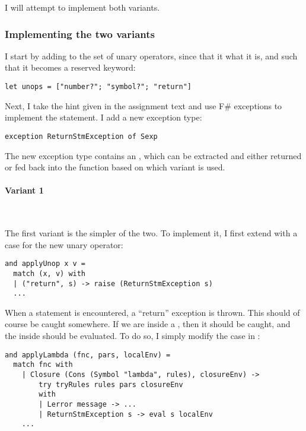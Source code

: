 I will attempt to implement both variants.

\subsubsection{Implementing the two variants}

I start by adding  to the set of unary operators, since that it
what it is, and such that it becomes a reserved keyword:

\begin{verbatim}
let unops = ["number?"; "symbol?"; "return"]
\end{verbatim}

Next, I take the hint given in the assignment text and use F\# exceptions to
implement the  statement. I add a new exception type:

\begin{verbatim}
exception ReturnStmException of Sexp
\end{verbatim}

The new exception type contains an , which can be extracted and either
returned or fed back into the  function based on which variant is used.


\paragraph{Variant 1}~\smallskip

The first variant is the simpler of the two. To implement it, I first extend
 with a case for the new unary operator:

\begin{verbatim}
and applyUnop x v =
  match (x, v) with
  | ("return", s) -> raise (ReturnStmException s)
  ...
\end{verbatim}

When a  statement is encountered, a ``return'' exception is thrown.
This should of course be caught somewhere. If we are inside a , then
it should be caught, and the  inside should be evaluated. To do so, I
simply modify the  case in :

\begin{verbatim}
and applyLambda (fnc, pars, localEnv) =
  match fnc with
    | Closure (Cons (Symbol "lambda", rules), closureEnv) ->
        try tryRules rules pars closureEnv
        with 
        | Lerror message -> ...
        | ReturnStmException s -> eval s localEnv
    ...
\end{verbatim}

